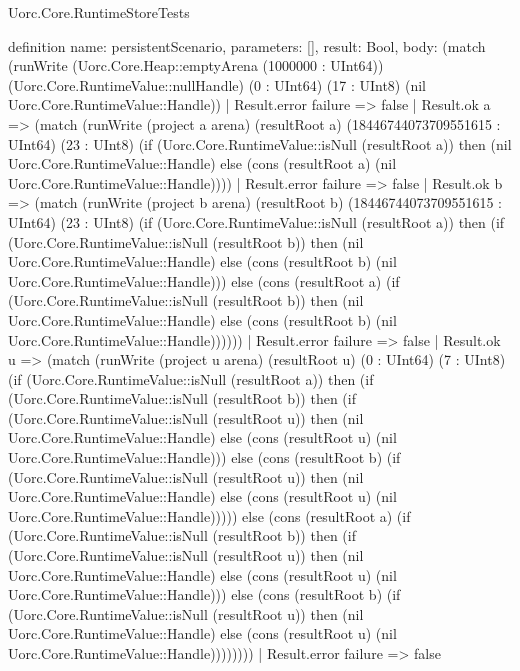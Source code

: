 \begin{lexlean}{Uorc.Core.RuntimeStoreTests}
\begin{semanticmodule}
definition{
  name: persistentScenario,
  parameters: [],
  result: Bool,
  body: (match (runWrite (Uorc.Core.Heap::emptyArena (1000000 : UInt64)) (Uorc.Core.RuntimeValue::nullHandle) (0 : UInt64) (17 : UInt8) (nil Uorc.Core.RuntimeValue::Handle))
    | Result.error failure => false
    | Result.ok a => (match (runWrite (project a arena) (resultRoot a) (18446744073709551615 : UInt64) (23 : UInt8) (if (Uorc.Core.RuntimeValue::isNull (resultRoot a)) then (nil Uorc.Core.RuntimeValue::Handle) else (cons (resultRoot a) (nil Uorc.Core.RuntimeValue::Handle))))
      | Result.error failure => false
      | Result.ok b => (match (runWrite (project b arena) (resultRoot b) (18446744073709551615 : UInt64) (23 : UInt8) (if (Uorc.Core.RuntimeValue::isNull (resultRoot a)) then (if (Uorc.Core.RuntimeValue::isNull (resultRoot b)) then (nil Uorc.Core.RuntimeValue::Handle) else (cons (resultRoot b) (nil Uorc.Core.RuntimeValue::Handle))) else (cons (resultRoot a) (if (Uorc.Core.RuntimeValue::isNull (resultRoot b)) then (nil Uorc.Core.RuntimeValue::Handle) else (cons (resultRoot b) (nil Uorc.Core.RuntimeValue::Handle))))))
        | Result.error failure => false
        | Result.ok u => (match (runWrite (project u arena) (resultRoot u) (0 : UInt64) (7 : UInt8) (if (Uorc.Core.RuntimeValue::isNull (resultRoot a)) then (if (Uorc.Core.RuntimeValue::isNull (resultRoot b)) then (if (Uorc.Core.RuntimeValue::isNull (resultRoot u)) then (nil Uorc.Core.RuntimeValue::Handle) else (cons (resultRoot u) (nil Uorc.Core.RuntimeValue::Handle))) else (cons (resultRoot b) (if (Uorc.Core.RuntimeValue::isNull (resultRoot u)) then (nil Uorc.Core.RuntimeValue::Handle) else (cons (resultRoot u) (nil Uorc.Core.RuntimeValue::Handle))))) else (cons (resultRoot a) (if (Uorc.Core.RuntimeValue::isNull (resultRoot b)) then (if (Uorc.Core.RuntimeValue::isNull (resultRoot u)) then (nil Uorc.Core.RuntimeValue::Handle) else (cons (resultRoot u) (nil Uorc.Core.RuntimeValue::Handle))) else (cons (resultRoot b) (if (Uorc.Core.RuntimeValue::isNull (resultRoot u)) then (nil Uorc.Core.RuntimeValue::Handle) else (cons (resultRoot u) (nil Uorc.Core.RuntimeValue::Handle))))))))
          | Result.error failure => false
}
\end{semanticmodule}
\end{lexlean}
